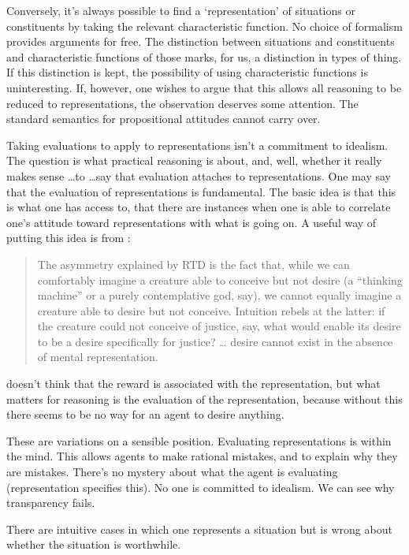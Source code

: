 \documentclass[10pt]{article}
\begin{document}
Conversely, it's always possible to find a `representation' of situations or constituents by taking the relevant characteristic function.
No choice of formalism provides arguments for free.
The distinction between situations and constituents and characteristic functions of those marks, for us, a distinction in types of thing.
If this distinction is kept, the possibility of using characteristic functions is uninteresting.
If, however, one wishes to argue that this allows all reasoning to be reduced to representations, the observation deserves some attention.
The standard semantics for propositional attitudes cannot carry over.

Taking evaluations to apply to representations isn't a commitment to idealism.
The question is what practical reasoning is about, and, well, whether it really makes sense \dots to \dots say that evaluation attaches to representations.
One may say that the evaluation of representations is fundamental.
The basic idea is that this is what one has access to, that there are instances when one is able to correlate one's attitude toward representations with what is going on.
A useful way of putting this idea is from \citeauthor{Schroeder:2004aa}:
\begin{quote}
  The asymmetry explained by RTD is the fact that, while we can comfortably imagine a creature able to conceive but not desire (a “thinking machine” or a purely contemplative god, say), we cannot equally imagine a creature able to desire but not conceive. Intuition rebels at the latter: if the creature could not conceive of justice, say, what would enable its desire to be a desire speciﬁcally for justice?
  \dots
  desire cannot exist in the absence of mental representation.\nolinebreak
  \mbox{ }\hfill\citeauthor[132]{Schroeder:2004aa}
\end{quote}
\citeauthor{Schroeder:2004aa} doesn't think that the reward is associated with the representation, but what matters for reasoning is the evaluation of the representation, because without this there seems to be no way for an agent to desire anything.

These are variations on a sensible position.
Evaluating representations is within the mind.
This allows agents to make rational mistakes, and to explain why they are mistakes.
There's no mystery about what the agent is evaluating (representation specifies this).
No one is committed to idealism.
We can see why transparency fails.

There are intuitive cases in which one represents a situation but is wrong about whether the situation is worthwhile.
\end{document}
